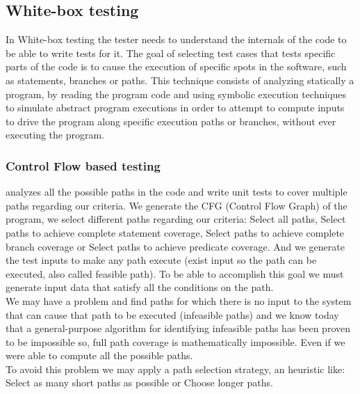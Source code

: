 \documentclass[10pt, conference, compsocconf]{IEEEtran}
\begin{document}
\subsection{White-box testing}
In White-box testing the tester needs to understand the internals of the code to be able to write tests for it.
The goal of selecting test cases that tests specific parts of the code is to cause the execution of specific spots in the software, such as statements, branches or
paths. This technique consists of analyzing statically a program, by reading the program code and using symbolic execution techniques to simulate abstract program
executions in order to attempt to compute inputs to drive the program along specific execution paths or branches, without ever executing the program.

\subsubsection{Control Flow based testing} analyzes all the possible paths in the code and write unit tests to cover multiple paths regarding our criteria.
We generate the CFG (Control Flow Graph) of the program, we select different paths regarding our criteria:
Select all paths, Select paths to achieve complete statement coverage\cite{stt,Ntafos:1988:CST:630792.631017},
Select paths to achieve complete branch coverage\cite{Roper1994,stt}
or Select paths to achieve predicate coverage\cite{stt,Ntafos:1988:CST:630792.631017}.
And we generate the test inputs to make any path execute (exist input so the path can be executed, also called feasible path).
To be able to accomplish this goal we must generate input data that satisfy all the conditions on the path.\\
\indent We may have a problem and find paths for which there is no input to the system that can cause that path to be executed (infeasible paths)
and we know today that a general-purpose algorithm for identifying infeasible paths has been proven to be impossible\cite{infeasible} so, full path coverage
is mathematically impossible. Even if we were able to compute all the possible paths.\\
To avoid this problem we may apply a path selection strategy, an heuristic like: Select as many short paths as possible or Choose longer paths.
\end{document}
